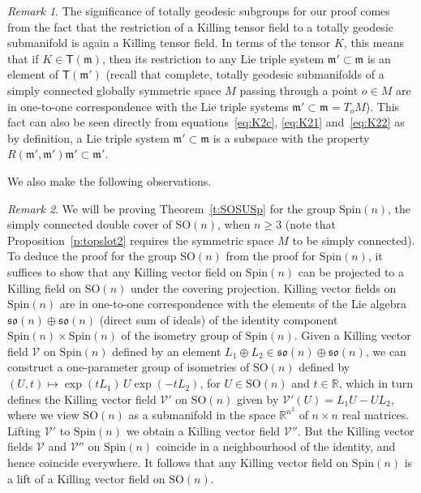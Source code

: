 \documentclass[12pt,reqno]{amsart}
\newcommand \br{\mathbb{R}}
\newcommand \SO{\mathrm{SO}}
\newcommand \Spin{\mathrm{Spin}}
\newcommand \cV{\mathcal{V}}
\newcommand \sT{\mathsf{T}}
\newcommand\m{\mathfrak m}
\newcommand \so{\mathfrak{so}}
\newcommand \<{\langle}
\renewcommand \>{\rangle}
\theoremstyle{definition}
\theoremstyle{remark}
\newtheorem{remark}{Remark}
\begin{document}
	\begin{remark} \label{rem:lts}
		The significance of totally geodesic subgroups for our proof comes from the fact that the restriction of a Killing tensor field to a totally geodesic submanifold is again a Killing tensor field. In terms of the tensor $K$, this means that if $K \in \sT(\m)$, then its restriction to any Lie triple system $\m' \subset \m$ is an element of $\sT(\m')$ (recall that complete, totally geodesic submanifolds of a simply connected globally symmetric space $M$ passing through a point $o \in M$ are in one-to-one correspondence with the Lie triple systems $\m' \subset \m = T_oM$). This fact can also be seen directly from equations~\eqref{eq:K2c}, \eqref{eq:K21} and~\eqref{eq:K22} as by definition, a Lie triple system $\m' \subset \m$ is a subspace with the property $R(\m',\m')\m' \subset \m'$.
	\end{remark}
	
We also make the following observations.
	
	\begin{remark} \label{rem:spintoso}
		We will be proving Theorem~\ref{t:SOSUSp} for the group $\Spin(n)$, the simply connected double cover of $\SO(n)$, when $n \ge 3$ (note that Proposition~\ref{p:topslot2} requires the symmetric space $M$ to be simply connected). To deduce the proof for the group $\SO(n)$ from the proof for $\Spin(n)$, it suffices to show that any Killing vector field on $\Spin(n)$ can be projected to a Killing field on $\SO(n)$ under the covering projection. Killing vector fields on $\Spin(n)$ are in one-to-one correspondence with the elements of the Lie algebra $\so(n) \oplus \so(n)$ (direct sum of ideals) of the identity component $\Spin(n) \times \Spin(n)$ of the isometry group of $\Spin(n)$. Given a Killing vector field $\cV$ on $\Spin(n)$ defined by an element $L_1 \oplus L_2 \in \so(n) \oplus \so(n)$, we can construct a one-parameter group of isometries of $\SO(n)$ defined by $(U,t) \mapsto \exp(tL_1) \, U \exp(-tL_2)$, for $U \in \SO(n)$ and $t \in \br$, which in turn defines the Killing vector field $\cV'$ on $\SO(n)$ given by $\cV'(U) = L_1U - UL_2$, where we view $\SO(n)$ as a submanifold in the space $\br^{n^2}$ of $n \times n$ real matrices. Lifting $\cV'$ to $\Spin(n)$ we obtain a Killing vector field $\cV''$. But the Killing vector fields $\cV$ and $\cV''$ on $\Spin(n)$ coincide in a neighbourhood of the identity, and hence coincide everywhere. It follows that any Killing vector field on $\Spin(n)$ is a lift of a Killing vector field on $\SO(n)$.
	\end{remark}
\end{document}
